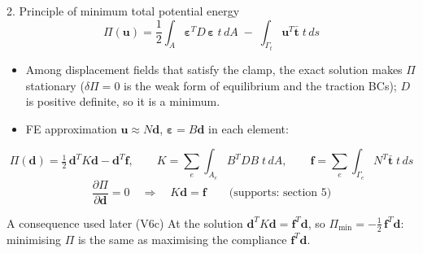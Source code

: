 \documentclass[aspectratio=169,10pt]{beamer}
\newcommand{\vd}{\mathbf d}
\newcommand{\vf}{\mathbf f}
\begin{document}
\begin{frame}{2. Principle of minimum total potential energy}
  \[
    \Pi(\mathbf u)=\frac12\int_A \bm\varepsilon^T D\,\bm\varepsilon\;t\,dA \;-\;\int_{\Gamma_t}\mathbf u^T\bar{\mathbf t}\;t\,ds
  \]
  \begin{itemize}
    \item Among displacement fields that satisfy the clamp, the exact solution makes $\Pi$ stationary
          ($\delta\Pi=0$ is the weak form of equilibrium and the traction BCs); $D$ is positive definite,
          so it is a minimum.
    \item FE approximation $\mathbf u\approx N\vd$, $\bm\varepsilon=B\vd$ in each element:
  \end{itemize}
  \[
    \Pi(\vd)=\tfrac12\,\vd^TK\vd-\vd^T\vf,\qquad
    K=\sum_e\int_{A_e}B^TDB\;t\,dA,\qquad
    \vf=\sum_e\int_{\Gamma_e}N^T\bar{\mathbf t}\;t\,ds
  \]
  \[
    \frac{\partial\Pi}{\partial\vd}=0\quad\Longrightarrow\quad K\vd=\vf\qquad\text{(supports: section 5)}
  \]
  \begin{block}{A consequence used later (V6c)}
    At the solution $\vd^TK\vd=\vf^T\vd$, so $\Pi_{\min}=-\tfrac12\,\vf^T\vd$:
    minimising $\Pi$ is the same as maximising the compliance $\vf^T\vd$.
  \end{block}
\end{frame}
\end{document}
